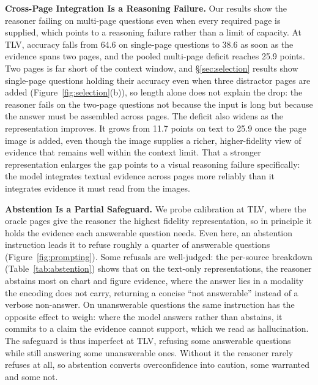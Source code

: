 \documentclass[11pt]{article}
\begin{document}
\textbf{Cross-Page Integration Is a Reasoning Failure.}
Our results show the reasoner failing on multi-page questions even when every required page is supplied, which points to a reasoning failure rather than a limit of capacity. At TLV, accuracy falls from 64.6 on single-page questions to 38.6 as soon as the evidence spans two pages, and the pooled multi-page deficit reaches 25.9 points. Two pages is far short of the context window, and \S\ref{sec:selection} results show single-page questions holding their accuracy even when three distractor pages are added (Figure~\ref{fig:selection}(b)), so length alone does not explain the drop: the reasoner fails on the two-page questions not because the input is long but because the answer must be assembled across pages. The deficit also widens as the representation improves. It grows from 11.7 points on text to 25.9 once the page image is added, even though the image supplies a richer, higher-fidelity view of evidence that remains well within the context limit. That a stronger representation enlarges the gap points to a visual reasoning failure specifically: the model integrates textual evidence across pages more reliably than it integrates evidence it must read from the images.



\textbf{Abstention Is a Partial Safeguard.}
We probe calibration at TLV, where the oracle pages give the reasoner the highest fidelity representation, so in principle it holds the evidence each answerable question needs. Even here, an abstention instruction leads it to refuse roughly a quarter of answerable questions (Figure~\ref{fig:prompting}). Some refusals are well-judged: the per-source breakdown (Table~\ref{tab:abstention}) shows that on the text-only representations, the reasoner abstains most on chart and figure evidence, where the answer lies in a modality the encoding does not carry, returning a concise ``not answerable'' instead of a verbose non-answer. On unanswerable questions the same instruction has the opposite effect to weigh: where the model answers rather than abstains, it commits to a claim the evidence cannot support, which we read as hallucination. The safeguard is thus imperfect at TLV, refusing some answerable questions while still answering some unanswerable ones. Without it the reasoner rarely refuses at all, so abstention converts overconfidence into caution, some warranted and some not.
\end{document}
